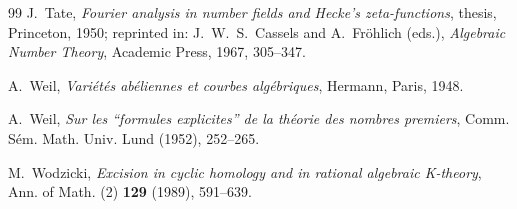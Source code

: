 \documentclass[11pt]{amsart}
\theoremstyle{definition}
\theoremstyle{remark}
\begin{document}
\begin{thebibliography}{99}
J.~Tate, \emph{Fourier analysis in number fields and Hecke's zeta-functions},
thesis, Princeton, 1950; reprinted in: J.~W.~S.~Cassels and A.~Fr\"ohlich
(eds.), \emph{Algebraic Number Theory}, Academic Press, 1967, 305--347.

A.~Weil, \emph{Vari\'et\'es ab\'eliennes et courbes alg\'ebriques}, Hermann,
Paris, 1948.

A.~Weil, \emph{Sur les ``formules explicites'' de la th\'eorie des nombres
premiers}, Comm. S\'em. Math. Univ. Lund (1952), 252--265.

M.~Wodzicki, \emph{Excision in cyclic homology and in rational algebraic
K-theory}, Ann. of Math. (2) \textbf{129} (1989), 591--639.

\end{thebibliography}
\end{document}
